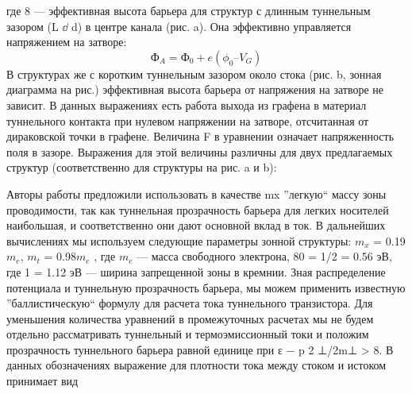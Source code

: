 \documentclass[a4paper,12pt]{article} %
\begin{document}
\noindent где 8 — эффективная высота барьера для структур с длинным туннельным зазором (L $\dd$ d) в центре канала (рис. a). Она эффективно управляется напряжением на затворе:
$$ \text{Ф}_A = \text{Ф}_0 + e(\phi_0 – V_G) $$
\noindent В структурах же с коротким туннельным зазором около стока (рис. b, зонная диаграмма на рис.) эффективная высота барьера от напряжения на затворе не зависит. В данных выражениях есть работа выхода из графена в материал туннельного контакта при нулевом напряжении на затворе, отсчитанная от дираковской точки в графене. Величина F в уравнении означает напряженность поля в зазоре. Выражения для этой величины различны для двух предлагаемых структур (соответственно для структуры на рис. a и b):
\begin{figure}[h!]
\end{figure}
\noindent Авторы работы предложили использовать в качестве mx ”легкую“ массу зоны проводимости, так как туннельная прозрачность барьера для легких носителей наибольшая, и соответственно они дают основной вклад в ток. В дальнейших вычислениях мы используем следующие параметры зонной структуры: $m_x$ = 0.19$m_e$, $m_t$ = 0.98$m_e$ , где $m_e$ — масса свободного электрона, 80 = 1/2 = 0.56 эВ, где 1 = 1.12 эВ — ширина запрещенной зоны в кремнии. Зная распределение потенциала и туннельную прозрачность барьера, мы можем применить известную ”баллистическую“ формулу для расчета тока туннельного транзистора. Для уменьшения количества уравнений в промежуточных расчетах мы не будем отдельно рассматривать туннельный и термоэмиссионный токи и положим прозрачность туннельного барьера равной единице при ε − p 2 ⊥/2m⊥ > 8. В данных обозначениях выражение для плотности тока между стоком и истоком принимает вид
\begin{figure}[h!]
\end{figure}
\end{document}
